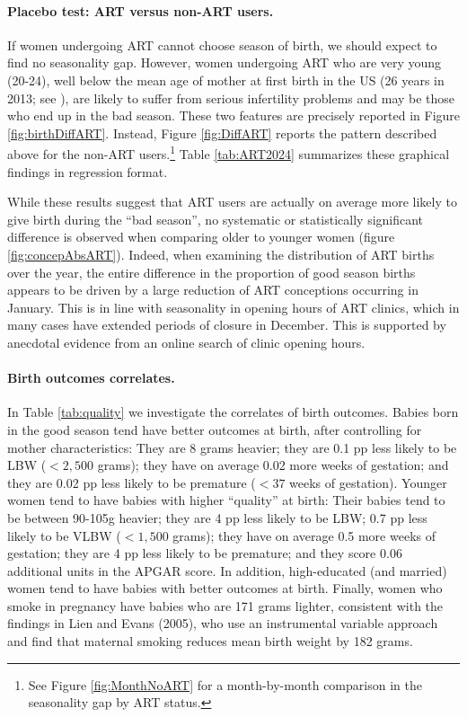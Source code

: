 \documentclass[a4paper, 12 pt]{article}
\theoremstyle{plain}
\begin{document}
\begin{doublespace}
\paragraph{Placebo test: ART versus non-ART users.} If women undergoing ART cannot choose season of birth, we should expect to find no seasonality gap. However, women undergoing ART who are very young (20-24), well below the mean age of mother at first birth in the US (26 years in 2013; see \citealp{Martinetal2015}), are likely to suffer from serious infertility problems and may be those who end up in the bad season. These two features are precisely reported in Figure \ref{fig:birthDiffART}. Instead, Figure \ref{fig:DiffART} reports the pattern described above for the non-ART users.\footnote{See Figure \ref{fig:MonthNoART} for a month-by-month comparison in the seasonality gap by ART status.} Table \ref{tab:ART2024} summarizes these graphical findings in regression format.

While these results suggest that ART users are actually on average more likely to give birth during the ``bad season'', no systematic or statistically significant difference is observed when comparing older to younger women (figure \ref{fig:concepAbsART}).  Indeed, when examining the distribution of ART births over the year, the entire difference in the proportion of good season births appears to be driven by a large reduction of ART conceptions occurring in January.  This is in line with seasonality in opening hours of ART clinics, which in many cases have extended periods of closure in December.  This is supported by anecdotal evidence from an online search of clinic opening hours.

\paragraph{Birth outcomes correlates.} In Table \ref{tab:quality} we investigate the correlates of birth outcomes. Babies born in the good season tend have better outcomes at birth, after controlling for mother characteristics: They are 8 grams heavier; they are 0.1 pp less likely to be LBW ($<2,500$ grams); they have on average 0.02 more weeks of gestation; and they are 0.02 pp less likely to be premature ($<37$ weeks of gestation). Younger women tend to have babies with higher ``quality'' at birth: Their babies tend to be between 90-105g heavier; they are 4 pp less likely to be LBW; 0.7 pp less likely to be VLBW ($<1,500$ grams); they have on average 0.5 more weeks of gestation; they are 4 pp less likely to be premature; and they score 0.06 additional units in the APGAR score. In addition, high-educated (and married) women tend to have babies with better outcomes at birth. Finally, women who smoke in pregnancy have babies who are 171 grams lighter, consistent with the findings in Lien and Evans (2005), who use an instrumental variable approach and find that maternal smoking reduces mean birth weight by 182 grams.



\end{doublespace}
\end{document}
